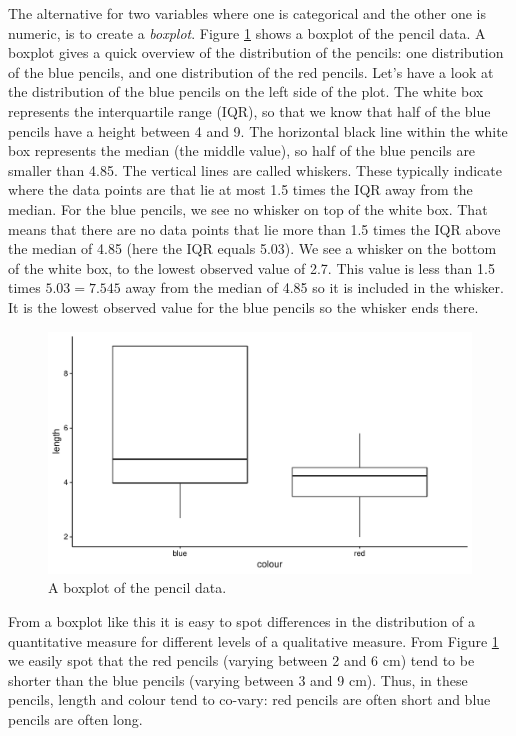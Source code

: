 \documentclass[]{book}\usepackage[]{graphicx}\usepackage[]{color}
\makeatletter
\def\maxwidth{ %
  \ifdim\Gin@nat@width>\linewidth
    \linewidth
  \else
    \Gin@nat@width
  \fi
}
\makeatother
\begin{document}
The alternative for two variables where one is categorical and the other one is numeric, is to create a \textit{boxplot}. Figure \ref{fig:crosstable_3} shows a boxplot of the pencil data. A boxplot gives a quick overview of the distribution of the pencils: one distribution of the blue pencils, and one distribution of the red pencils. Let's have a look at the distribution of the blue pencils on the left side of the plot. The white box represents the interquartile range (IQR), so that we know that half of the blue pencils have a height between 4 and 9. The horizontal black line within the white box represents the median (the middle value), so half of the blue pencils are smaller than 4.85. The vertical lines are called whiskers. These typically indicate where the data points are that lie at most 1.5 times the IQR away from the median. For the blue pencils, we see no whisker on top of the white box. That means that there are no data points that lie more than 1.5 times the IQR above the median of 4.85 (here the IQR equals 5.03). We see a whisker on the bottom of the white box, to the lowest observed value of 2.7. This value is less than 1.5 times $5.03 = 7.545$ away from the median of 4.85 so it is included in the whisker. It is the lowest observed value for the blue pencils so the whisker ends there. 


\begin{figure}

{\centering \includegraphics[width=\maxwidth]{figure/crosstable_3-1} 

}

\caption[A boxplot of the pencil data]{A boxplot of the pencil data.}\label{fig:crosstable_3}
\end{figure}



From a boxplot like this it is easy to spot differences in the distribution of a quantitative measure for different levels of a qualitative measure. From Figure \ref{fig:crosstable_3} we easily spot that the red pencils (varying between 2 and 6 cm) tend to be shorter than the blue pencils (varying between 3 and 9 cm). Thus, in these pencils, length and colour tend to co-vary: red pencils are often short and blue pencils are often long.
\end{document}
